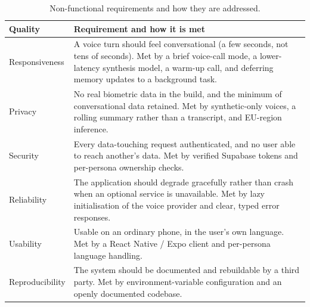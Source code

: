 \documentclass[11pt,a4paper]{report}
\begin{document}
\begin{table}[htbp]
\centering
\caption{Non-functional requirements and how they are addressed.}
\label{tab:nfr}
\small
\begin{tabularx}{\linewidth}{@{}l X@{}}
\toprule
\textbf{Quality} & \textbf{Requirement and how it is met} \\
\midrule
Responsiveness & A voice turn should feel conversational (a few seconds, not tens of seconds). Met by a brief voice-call mode, a lower-latency synthesis model, a warm-up call, and deferring memory updates to a background task. \\
Privacy        & No real biometric data in the build, and the minimum of conversational data retained. Met by synthetic-only voices, a rolling summary rather than a transcript, and EU-region inference. \\
Security       & Every data-touching request authenticated, and no user able to reach another's data. Met by verified Supabase tokens and per-persona ownership checks. \\
Reliability    & The application should degrade gracefully rather than crash when an optional service is unavailable. Met by lazy initialisation of the voice provider and clear, typed error responses. \\
Usability      & Usable on an ordinary phone, in the user's own language. Met by a React Native / Expo client and per-persona language handling. \\
Reproducibility & The system should be documented and rebuildable by a third party. Met by environment-variable configuration and an openly documented codebase. \\
\bottomrule
\end{tabularx}
\end{table}
\end{document}
